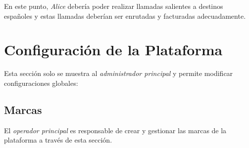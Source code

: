 \documentclass[letterpaper,10pt,spanish]{sphinxmanual}
\begin{document}
En este punto, \emph{Alice} debería poder realizar llamadas salientes a destinos españoles y estas llamadas deberían ser enrutadas y facturadas adecuadamente.


\chapter{Configuración de la Plataforma}
\label{administration_portal/platform/index::doc}\label{administration_portal/platform/index:platform-configuration}
Esta sección solo se muestra al \emph{administrador principal} y permite modificar configuraciones globales:


\section{Marcas}
\label{administration_portal/platform/brands:brands}\label{administration_portal/platform/brands::doc}\label{administration_portal/platform/brands:id1}
El \emph{operador principal} es responsable de crear y gestionar las marcas de la plataforma a través de esta sección.
\end{document}
